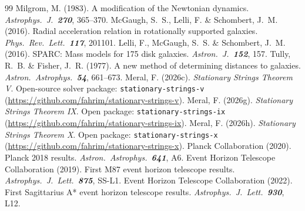 \documentclass[12pt,a4paper]{article}
\begin{document}
\begin{thebibliography}{99}
     Milgrom, M. (1983). A modification of the Newtonian dynamics.
    \textit{Astrophys.\ J.\ \textbf{270}}, 365--370.
     McGaugh, S.~S., Lelli, F. \& Schombert, J.~M. (2016).
    Radial acceleration relation in rotationally supported galaxies.
    \textit{Phys.\ Rev.\ Lett.\ \textbf{117}}, 201101.
     Lelli, F., McGaugh, S.~S. \& Schombert, J.~M. (2016).
    SPARC: Mass models for 175 disk galaxies.
    \textit{Astron.\ J.\ \textbf{152}}, 157.
     Tully, R.~B. \& Fisher, J.~R. (1977). A new method of
    determining distances to galaxies. \textit{Astron.\ Astrophys.\ \textbf{54}}, 661--673.
     Meral, F. (2026c). \textit{Stationary Strings Theorem V}.
    Open-source solver package: \texttt{stationary-strings-v}
    (\url{https://github.com/fahrim/stationary-strings-v}).
     Meral, F. (2026g). \textit{Stationary Strings Theorem IX}.
    Open package: \texttt{stationary-strings-ix}
    (\url{https://github.com/fahrim/stationary-strings-ix}).
     Meral, F. (2026h). \textit{Stationary Strings Theorem X}.
    Open package: \texttt{stationary-strings-x}
    (\url{https://github.com/fahrim/stationary-strings-x}).
     Planck Collaboration (2020). Planck 2018 results.
    \textit{Astron.\ Astrophys.\ \textbf{641}}, A6.
     Event Horizon Telescope Collaboration (2019).
    First M87 event horizon telescope results. \textit{Astrophys.\ J.\ Lett.\
    \textbf{875}}, SS-L1.
     Event Horizon Telescope Collaboration (2022).
    First Sagittarius A* event horizon telescope results.
    \textit{Astrophys.\ J.\ Lett.\ \textbf{930}}, L12.
\end{thebibliography}
\end{document}
